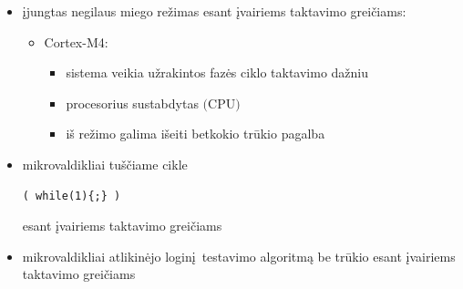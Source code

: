 \documentclass[a4paper, 12pt]{article} %
\begin{document}
\begin{onehalfspacing}
\begin{itemize}
\begin{itemize}
\begin{itemize}
\end{itemize}
\item 
\end{itemize}
\item \k{i}jungtas negilaus miego re\v{z}imas esant \k{i}vairiems taktavimo grei\v{c}iams:
\begin{itemize} %
\item Cortex-M4:
\begin{itemize}
\item sistema veikia u\v{z}rakintos faz\.es ciklo taktavimo da\v{z}niu
\item procesorius sustabdytas $($CPU$)$
\item i\v{s} re\v{z}imo galima i\v{s}eiti betkokio tr\=ukio pagalba
\end{itemize}
\end{itemize}
\item mikrovaldikliai tu\v{s}\v{c}iame cikle \begin{verbatim}( while(1){;} )\end{verbatim}esant \k{i}vairiems taktavimo grei\v{c}iams
\item mikrovaldikliai atlikin\.ejo login\k{i}\ testavimo algoritm\k{a} be tr\=ukio esant \k{i}vairiems taktavimo grei\v{c}iams  
\end{itemize}

\newpage
   

\end{onehalfspacing}
\end{document}
